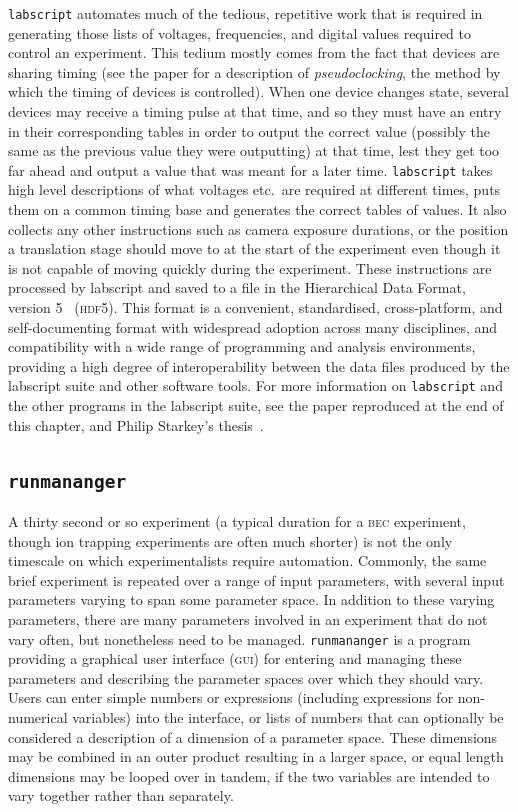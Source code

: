 \texttt{labscript} automates much of the tedious, repetitive work that is required in generating those lists of voltages, frequencies, and digital values required to control an experiment. This tedium mostly comes from the fact that devices are sharing timing (see the paper for a description of \emph{pseudoclocking}, the method by which the timing of devices is controlled). When one device changes state, several devices may receive a timing pulse at that time, and so they must have an entry in their corresponding tables in order to output the correct value (possibly the same as the previous value they were outputting) at that time, lest they get too far ahead and output a value that was meant for a later time. \texttt{labscript} takes high level descriptions of what voltages etc.~are required at different times, puts them on a common timing base and generates the correct tables of values. It also collects any other instructions such as camera exposure durations, or the position a translation stage should move to at the start of the experiment even though it is not capable of moving quickly during the experiment. These instructions are processed by labscript and saved to a file in the Hierarchical Data Format, version 5~\cite{the_hdf_group_hierarchical_1997} (\textsc{hdf5}). This format is a convenient, standardised, cross-platform, and self-documenting format with widespread adoption across many disciplines, and compatibility with a wide range of programming and analysis environments, providing a high degree of interoperability between the data files produced by the labscript suite and other software tools. For more information on \texttt{labscript} and the other programs in the labscript suite, see the paper reproduced at the end of this chapter, and Philip Starkey's thesis~\cite{starkey_thesis_2018}.

\subsection{\texttt{runmananger}}

A thirty second or so experiment (a typical duration for a \textsc{bec} experiment, though ion trapping experiments are often much shorter) is not the only timescale on which experimentalists require automation. Commonly, the same brief experiment is repeated over a range of input parameters, with several input parameters varying to span some parameter space. In addition to these varying parameters, there are many parameters involved in an experiment that do not vary often, but nonetheless need to be managed. \texttt{runmananger} is a program providing a graphical user interface (\textsc{gui}) for entering and managing these parameters and describing the parameter spaces over which they should vary. Users can enter simple numbers or expressions (including expressions for non-numerical variables) into the interface, or lists of numbers that can optionally be considered a description of a dimension of a parameter space. These dimensions may be combined in an outer product resulting in a larger space, or equal length dimensions may be looped over in tandem, if the two variables are intended to vary together rather than separately.

